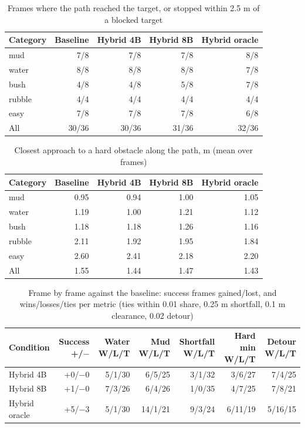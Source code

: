 \begin{table}[t]
\centering
\small
\begin{tabular}{lrrrr}
\toprule
Category & Baseline & Hybrid 4B & Hybrid 8B & Hybrid oracle \\
\midrule
mud & 7/8 & 7/8 & 7/8 & 8/8 \\
water & 8/8 & 8/8 & 8/8 & 7/8 \\
bush & 4/8 & 4/8 & 5/8 & 7/8 \\
rubble & 4/4 & 4/4 & 4/4 & 4/4 \\
easy & 7/8 & 7/8 & 7/8 & 6/8 \\
All & 30/36 & 30/36 & 31/36 & 32/36 \\
\bottomrule
\end{tabular}
\caption{Frames where the path reached the target, or stopped within 2.5 m of a blocked target}
\label{tab:success}
\end{table}

\begin{table}[t]
\centering
\small
\begin{tabular}{lrrrr}
\toprule
Category & Baseline & Hybrid 4B & Hybrid 8B & Hybrid oracle \\
\midrule
mud & 0.95 & 0.94 & 1.00 & 1.05 \\
water & 1.19 & 1.00 & 1.21 & 1.12 \\
bush & 1.18 & 1.18 & 1.26 & 1.16 \\
rubble & 2.11 & 1.92 & 1.95 & 1.84 \\
easy & 2.60 & 2.41 & 2.18 & 2.20 \\
All & 1.55 & 1.44 & 1.47 & 1.43 \\
\bottomrule
\end{tabular}
\caption{Closest approach to a hard obstacle along the path, m (mean over frames)}
\label{tab:clearance}
\end{table}

\begin{table}[t]
\centering
\small
\begin{tabular}{lrrrrrr}
\toprule
Condition & Success +/$-$ & Water W/L/T & Mud W/L/T & Shortfall W/L/T & Hard min W/L/T & Detour W/L/T \\
\midrule
Hybrid 4B & +0/$-$0 & 5/1/30 & 6/5/25 & 3/1/32 & 3/6/27 & 7/4/25 \\
Hybrid 8B & +1/$-$0 & 7/3/26 & 6/4/26 & 1/0/35 & 4/7/25 & 7/8/21 \\
Hybrid oracle & +5/$-$3 & 5/1/30 & 14/1/21 & 9/3/24 & 6/11/19 & 5/16/15 \\
\bottomrule
\end{tabular}
\caption{Frame by frame against the baseline: success frames gained/lost, and wins/losses/ties per metric (ties within 0.01 share, 0.25 m shortfall, 0.1 m clearance, 0.02 detour)}
\label{tab:paired}
\end{table}
